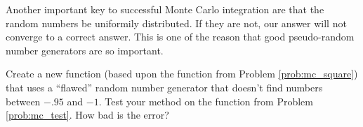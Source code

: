 Another important key to successful Monte Carlo integration are that the random numbers be uniformily distributed. If they are not, our answer will not converge to a correct answer. This is one of the reason that good pseudo-random number generators are so important.

\begin{problem}
\label{prob:mc_flawed}
Create a new function (based upon the function from Problem \ref{prob:mc_square}) that uses a ``flawed'' random number generator that doesn't find numbers between $-.95$ and $-1$. Test your method on the function from Problem \ref{prob:mc_test}. How bad is the error? 
\end{problem}




%
%
%
%
%
%
%
%
